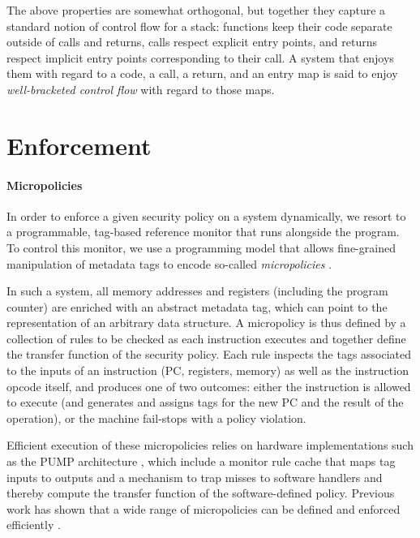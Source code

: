 \documentclass[acmsmall,review,anonymous]{acmart}\settopmatter{printfolios=true,printccs=false,printacmref=false}
\begin{document}

The above properties are somewhat orthogonal, but together they
capture a standard notion of control flow for a stack: functions keep
their code separate outside of calls and returns, calls respect
explicit entry points, and returns respect implicit entry points
corresponding to their call.  A system that enjoys them with regard to
a code, a call, a return, and an entry map is said to enjoy
{\em well-bracketed control flow} with regard to those maps.


\section{Enforcement}
\label{sec:enforcement}


\paragraph*{Micropolicies}
%
In order to enforce a given security policy on a system dynamically, we resort
to a programmable, tag-based reference monitor that runs alongside the program.
To control this monitor, we use a programming model that allows fine-grained
manipulation of metadata tags to encode so-called \emph{micropolicies}
.

In such a system, all memory addresses and registers (including the program
counter) are enriched with an abstract metadata tag, which can point to the
representation of an arbitrary data structure. A micropolicy is thus defined by
a collection of rules to be checked as each instruction executes and together
define the transfer function of the security policy. Each rule inspects the tags
associated to the inputs of an instruction (PC, registers, memory) as well as
the instruction opcode itself, and produces one of two outcomes: either the
instruction is allowed to execute (and generates and assigns tags for the new PC
and the result of the operation), or the machine fail-stops with a policy
violation.

Efficient execution of these micropolicies relies on hardware implementations
such as the PUMP architecture , which include a monitor rule cache that
maps tag inputs to outputs and a mechanism to trap misses to software handlers
and thereby compute the transfer function of the software-defined policy.
Previous work has shown that a wide range of micropolicies can be defined and
enforced efficiently .
%
\end{document}
